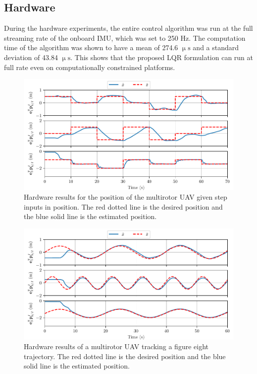 
\subsection{Hardware}

During the hardware experiments, the entire control algorithm was run at the
full streaming rate of the onboard IMU, which was set to 250 Hz. The computation
time of the algorithm was shown to have a mean of 274.6 $\upmu \mathrm{s}$ and a standard
deviation of 43.84 $\upmu \mathrm{s}$. This shows that the proposed LQR
formulation can run at full rate even on computationally constrained platforms.

\begin{figure}
  \centering
  \includegraphics[width=6.5in]{figures/mocap_wps_position}
  \caption[LQR Hardware Results Flying Waypoints]{Hardware results for the position of the multirotor UAV given step
  inputs in position. The red dotted line is the desired position and the blue
solid line is the estimated position.}
  \label{f:hardware_wps}
\end{figure}

\begin{figure}
  \centering
  \includegraphics[width=6.5in]{figures/mocap_fig8_position}
  \caption[LQR Hardware Results Flying a Trajectory]{Hardware results of a multirotor UAV tracking a figure eight
  trajectory. The red dotted line is the desired position and the blue solid
line is the estimated position.}
  \label{f:hardware_fig8}
\end{figure}

